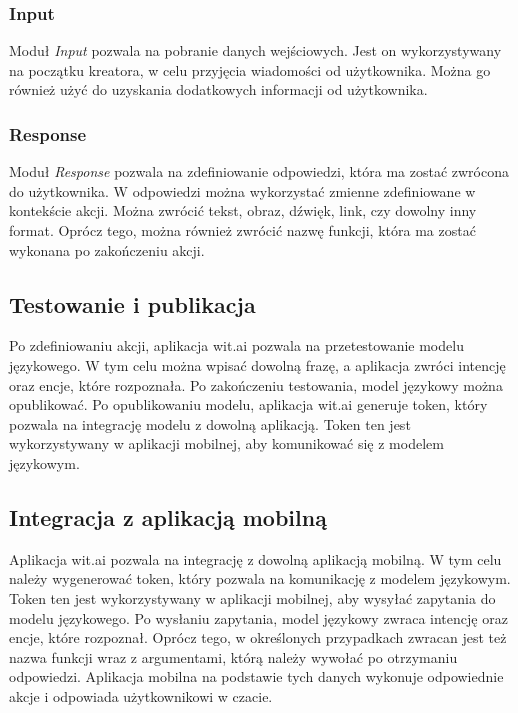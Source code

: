\subsubsection{Input}
Moduł \textit{Input} pozwala na pobranie danych wejściowych. Jest on wykorzystywany na początku kreatora, w celu przyjęcia wiadomości od użytkownika. Można go również użyć do uzyskania dodatkowych informacji od użytkownika.

\subsubsection{Response}
Moduł \textit{Response} pozwala na zdefiniowanie odpowiedzi, która ma zostać zwrócona do użytkownika. W odpowiedzi można wykorzystać zmienne zdefiniowane w kontekście akcji. Można zwrócić tekst, obraz, dźwięk, link, czy dowolny inny format. Oprócz tego, można również zwrócić nazwę funkcji, która ma zostać wykonana po zakończeniu akcji.


\subsection{Testowanie i publikacja}
Po zdefiniowaniu akcji, aplikacja wit.ai pozwala na przetestowanie modelu językowego. W tym celu można wpisać dowolną frazę, a aplikacja zwróci intencję oraz encje, które rozpoznała. Po zakończeniu testowania, model językowy można opublikować. Po opublikowaniu modelu, aplikacja wit.ai generuje token, który pozwala na integrację modelu z dowolną aplikacją. Token ten jest wykorzystywany w aplikacji mobilnej, aby komunikować się z modelem językowym.

\subsection{Integracja z aplikacją mobilną}
Aplikacja wit.ai pozwala na integrację z dowolną aplikacją mobilną. W tym celu należy wygenerować token, który pozwala na komunikację z modelem językowym. Token ten jest wykorzystywany w aplikacji mobilnej, aby wysyłać zapytania do modelu językowego. Po wysłaniu zapytania, model językowy zwraca intencję oraz encje, które rozpoznał. Oprócz tego, w określonych przypadkach zwracan jest też nazwa funkcji wraz z argumentami, którą należy wywołać po otrzymaniu odpowiedzi. Aplikacja mobilna na podstawie tych danych wykonuje odpowiednie akcje i odpowiada użytkownikowi w czacie.

